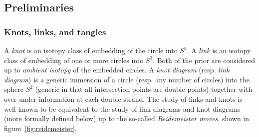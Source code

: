 \documentclass[amsmath,longbibliography,secnumarabic,floatfix,amssymb,nofootinbib,nobibnotes,letterpaper,11pt,tightenlines,notitlepage,showkeys,showlabels]{amsart}%
\begin{document}
\subsection{Preliminaries}
\label{sec:prelimdefs}

\subsubsection{Knots, links, and tangles}
\label{sec:knotlinktangledef}

A \emph{knot} is an isotopy class of embedding of the circle into
$S^3$. A \emph{link} is an isotopy class of embedding of one or more
circles into $S^3$. Both of the prior are considered up to
\emph{ambient isotopy} of the embedded circles. A \emph{knot diagram}
(resp. \emph{link diagram}) is a generic immersion of a circle
(resp. any number of circles) into the sphere $S^2$ (generic in that
all intersection points are double points) together with over-under
information at each double strand. The study of links and knots is
well known to be equivalent to the study of link diagrams and knot
diagrams (more formally defined below) up to the so-called
\emph{Reidemeister moves}, shown in figure~\ref{fig:reidemeister}.
\end{document}
